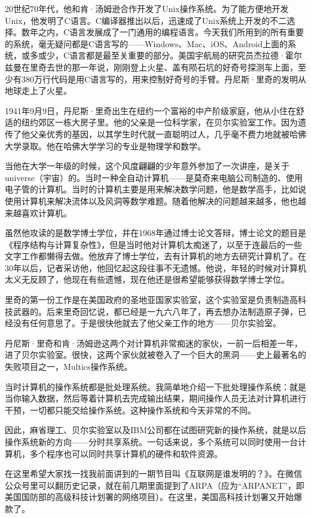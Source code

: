 \documentclass[
  letterpaper,
  DIV=11,
  numbers=noendperiod]{scrreprt}
\begin{document}
20世纪70年代，他和肯·汤姆逊合作开发了Unix操作系统。为了能方便地开发Unix，他发明了C语言。C编译器推出以后，迅速成了Unix系统上开发的不二选择。数年之内，C语言发展成了一门通用的编程语言。今天我们所用到的所有重要的系统，毫无疑问都是C语言写的------Windows、Mac、iOS、Android上面的系统，或多或少，C语言都是最至关重要的部分。美国宇航局的研究员杰拉德·霍尔兹曼在里奇去世的那一年说，刚刚登上火星、盖有陨石坑的好奇号探测车上面，至少有380万行代码是用C语言写的，用来控制好奇号的手臂。丹尼斯·里奇的发明从地球走上了火星。

1941年9月9日，丹尼斯·里奇出生在纽约一个富裕的中产阶级家庭，他从小住在舒适的纽约郊区一栋大房子里。他的父亲是一位科学家，在贝尔实验室工作。因为遗传了他父亲优秀的基因，以其学生时代就一直聪明过人，几乎毫不费力地就被哈佛大学录取。他在哈佛大学学习的专业是物理学和数学。

当他在大学一年级的时候，这个风度翩翩的少年意外参加了一次讲座，是关于universe（宇宙）的。当时一种全自动计算机------是莫奇来电脑公司制造的、使用电子管的计算机。当时的计算机主要是用来解决数学问题，他是数学高手，比如说使用计算机来解决流体以及风洞等数学难题。随着他解决的问题越来越多，他也越来越喜欢计算机。

虽然他攻读的是数学博士学位，并在1968年通过博士论文答辩，博士论文的题目是《程序结构与计算复杂性》，但是当时他对计算机太痴迷了，以至于连最后的一些文字工作都懒得去做。他放弃了博士学位，去有计算机的地方去研究计算机了。在30年以后，记者采访他，他回忆起这段往事不无遗憾。他说，年轻的时候对计算机太义无反顾了，他现在有些遗憾，现在他还是很希望能够获得数学博士学位。

里奇的第一份工作是在美国政府的圣地亚国家实验室，这个实验室是负责制造高科技武器的。后来里奇回忆说，都已经是一九六八年了，再去想办法制造原子弹，已经没有任何意思了。于是很快他就去了他父亲工作的地方------贝尔实验室。

丹尼斯·里奇和肯·汤姆逊这两个对计算机非常痴迷的家伙，一前一后相差一年，进了贝尔实验室。很快，这两个家伙就被卷入了一个巨大的黑洞------史上最著名的失败项目之一，Multics操作系统。

当时计算机的操作系统都是批处理系统。我简单地介绍一下批处理操作系统：就是当你输入数据，然后等着计算机去完成输出结果，期间操作人员无法对计算机进行干预，一切都只能交给操作系统。这种操作系统和今天非常的不同。

因此，麻省理工、贝尔实验室以及IBM公司都在试图研究新的操作系统，就是以后操作系统新的方向------分时共享系统。一句话来说，多个系统可以同时使用一台计算机，多个程序也可以同时共享计算机的硬件和软件资源。

在这里希望大家找一找我前面讲到的一期节目叫《互联网是谁发明的？》。在微信公众号里可以翻历史记录，就在前几期里面提到了ARPA（应为``ARPANET''，即美国国防部的高级科技计划署的网络项目）。在这里，美国高科技计划署又开始爆款了。
\end{document}
